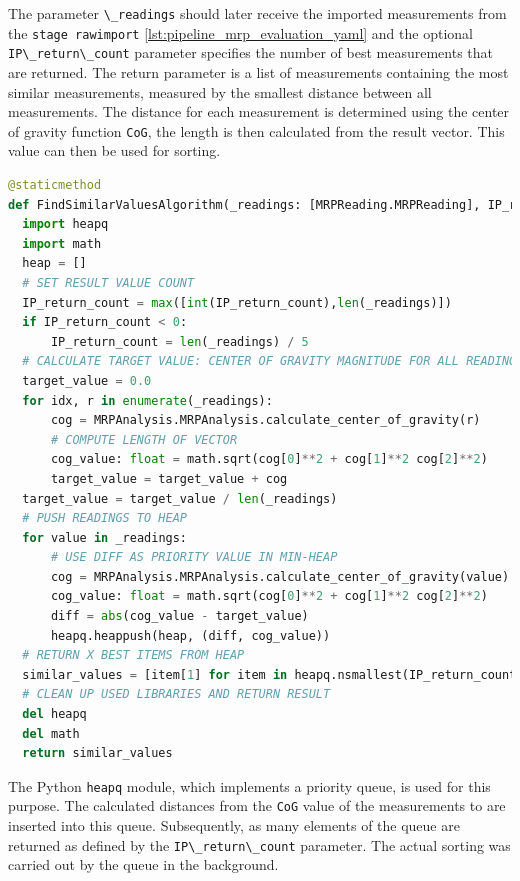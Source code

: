 The parameter \passthrough{\lstinline!\_readings!} should later receive
the imported measurements from the
\passthrough{\lstinline!stage rawimport!}
\ref{lst:pipeline_mrp_evaluation_yaml} and the optional
\passthrough{\lstinline!IP\_return\_count!} parameter specifies the
number of best measurements that are returned. The return parameter is a
list of measurements containing the most similar measurements, measured
by the smallest distance between all measurements. The distance for each
measurement is determined using the center of gravity function
\passthrough{\lstinline!CoG!}, the length is then calculated from the
result vector. This value can then be used for sorting.

\begin{lstlisting}[language=Python, caption={User implemented custom find most similar readings algorithm}, label=lst:custom_find_similar_values_algorithm]
@staticmethod
def FindSimilarValuesAlgorithm(_readings: [MRPReading.MRPReading], IP_return_count: int = -1) -> [MRPReading.MRPReading]:
  import heapq
  import math
  heap = []
  # SET RESULT VALUE COUNT
  IP_return_count = max([int(IP_return_count),len(_readings)])
  if IP_return_count < 0:
      IP_return_count = len(_readings) / 5
  # CALCULATE TARGET VALUE: CENTER OF GRAVITY MAGNITUDE FOR ALL READINGS
  target_value = 0.0
  for idx, r in enumerate(_readings):
      cog = MRPAnalysis.MRPAnalysis.calculate_center_of_gravity(r)
      # COMPUTE LENGTH OF VECTOR
      cog_value: float = math.sqrt(cog[0]**2 + cog[1]**2 cog[2]**2)
      target_value = target_value + cog
  target_value = target_value / len(_readings)
  # PUSH READINGS TO HEAP
  for value in _readings:
      # USE DIFF AS PRIORITY VALUE IN MIN-HEAP
      cog = MRPAnalysis.MRPAnalysis.calculate_center_of_gravity(value)
      cog_value: float = math.sqrt(cog[0]**2 + cog[1]**2 cog[2]**2)
      diff = abs(cog_value - target_value)
      heapq.heappush(heap, (diff, cog_value))
  # RETURN X BEST ITEMS FROM HEAP
  similar_values = [item[1] for item in heapq.nsmallest(IP_return_count, heap)]
  # CLEAN UP USED LIBRARIES AND RETURN RESULT
  del heapq
  del math
  return similar_values
\end{lstlisting}

The Python \passthrough{\lstinline!heapq!} \cite{heapq} module,
which implements a priority queue, is used for this purpose. The
calculated distances from the \passthrough{\lstinline!CoG!} value of the
measurements to are inserted into this queue. Subsequently, as many
elements of the queue are returned as defined by the
\passthrough{\lstinline!IP\_return\_count!} parameter. The actual
sorting was carried out by the queue in the background.

